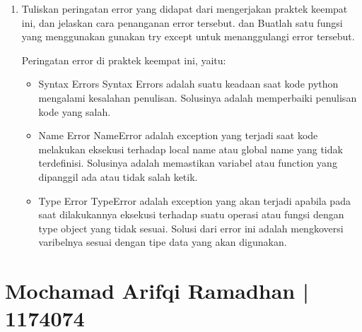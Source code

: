 \begin{enumerate}
	\item Tuliskan  peringatan  error  yang  didapat  dari  mengerjakan  praktek  keempat  ini, dan  jelaskan  cara  penanganan  error  tersebut.   dan  Buatlah  satu  fungsi  yang menggunakan gunakan try except untuk menanggulangi error tersebut.
	
	Peringatan error di praktek keempat ini, yaitu:
	\begin{itemize}
		\item Syntax Errors
		Syntax Errors adalah suatu keadaan saat kode python mengalami kesalahan penulisan. Solusinya adalah memperbaiki penulisan kode yang salah.
		
		\item Name Error
		NameError adalah exception yang terjadi saat kode melakukan eksekusi terhadap local name atau global name yang tidak terdefinisi. Solusinya adalah memastikan variabel atau function yang dipanggil ada atau tidak salah ketik.
		
		\item Type Error
		TypeError adalah exception yang akan terjadi apabila pada saat dilakukannya eksekusi terhadap suatu operasi atau fungsi dengan type object yang tidak sesuai. Solusi dari error ini adalah mengkoversi varibelnya sesuai dengan tipe data yang akan digunakan.
	\end{itemize}

\end{enumerate}

\section{Mochamad Arifqi Ramadhan | 1174074}
